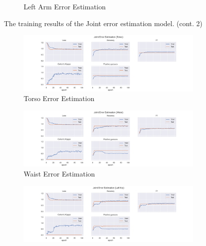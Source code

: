 \begin{figure}
\begin{subfigure}[b]{0.47\linewidth}
      \caption{Left Arm Error Estimation}
      \label{fig:riha_jt_ee}
  \end{subfigure}
  \caption[Joint model training results]{The training results of the Joint error estimation model. (cont. 2)}
\end{figure}

\begin{figure}
  \centering
  \begin{subfigure}[b]{0.47\linewidth}
      \centering
      \includegraphics[width=\textwidth]{figures/Results/jt/JointErrorEstimation_Torso.png}
      \caption{Torso Error Estimation}
      \label{fig:torso_jt_ee}
  \end{subfigure}
  \hfill
  \begin{subfigure}[b]{0.47\linewidth}
    \centering
    \includegraphics[width=\textwidth]{figures/Results/jt/JointErrorEstimation_Waist.png}
    \caption{Waist Error Estimation}
    \label{fig:waist_jt_ee}
  \end{subfigure}
  \hfill
  \begin{subfigure}[b]{0.47\linewidth}
      \centering
      \includegraphics[width=\textwidth]{figures/Results/jt/JointErrorEstimation_Left hip.png}

\end{subfigure}
\end{figure}
